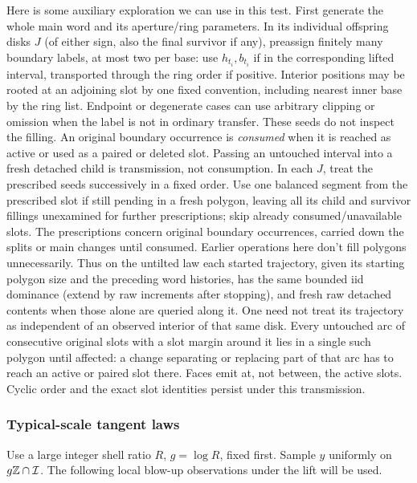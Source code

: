Here is some auxiliary exploration we can use in this test. First generate the whole main
word and its aperture/ring parameters. In its individual offspring disks \(J\) (of either
sign, also the final survivor if any), preassign finitely many boundary labels, at most
two per base: use \(h_{t_i},b_{t_i}\) if in the corresponding lifted interval, transported
through the ring order if positive. Interior positions may be rooted at an adjoining slot
by one fixed convention, including nearest inner base by the ring list. Endpoint or
degenerate cases can use arbitrary clipping or omission when the label is not in ordinary
transfer. These seeds do not inspect the filling. An original boundary occurrence is \emph{consumed} when it is reached as
active or used as a paired or deleted slot. Passing an untouched interval
into a fresh detached child is transmission, not consumption. In each
\(J\), treat the prescribed seeds successively in a fixed order. Use one balanced segment from the prescribed slot if still pending in a
fresh polygon, leaving all its child and survivor fillings unexamined for further
prescriptions; skip already consumed/unavailable slots. The prescriptions concern original
boundary occurrences, carried down the splits or main changes until consumed. Earlier
operations here don't fill polygons unnecessarily. Thus on the untilted law each started
trajectory, given its starting polygon size and the preceding word histories, has the same
bounded iid dominance (extend by raw increments after stopping), and fresh raw detached
contents when those alone are queried along it. One need not treat its trajectory as
independent of an observed interior of that same disk. Every untouched arc of consecutive
original slots with a slot margin around it lies in a single such polygon until affected:
a change separating or replacing part of that arc has to reach an active or paired slot
there. Faces emit at, not between, the active slots. Cyclic order and the exact slot
identities persist under this transmission.

\subsubsection{Typical-scale tangent laws}

Use a large integer shell ratio \(R\), \(g=\log R\), fixed first. Sample \(y\) uniformly
on \(g\mathbb Z\cap{\cal I}\). The following local blow-up observations under the lift
will be used.

